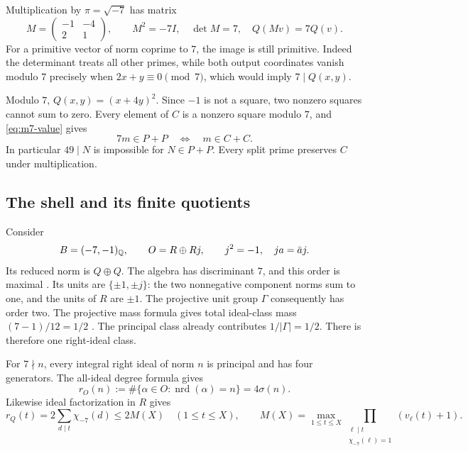 Multiplication by \(\pi=\sqrt{-7}\) has matrix
\[
 M=\begin{pmatrix}-1&-4\\2&1\end{pmatrix},\qquad
 M^2=-7I,\quad \det M=7,\quad Q(Mv)=7Q(v).
\]
For a primitive vector of norm coprime to \(7\), the image is still
primitive. Indeed the determinant treats all other primes, while
both output coordinates vanish modulo \(7\) precisely when
\(2x+y\equiv0\pmod7\), which would imply \(7\mid Q(x,y)\).

Modulo \(7\), \(Q(x,y)=(x+4y)^2\). Since \(-1\) is not a square,
two nonzero squares cannot sum to zero. Every element of \(C\) is
a nonzero square modulo \(7\), and \eqref{eq:m7-value} gives
\begin{equation}
      7m\in P+P\quad\Longleftrightarrow\quad m\in C+C.           \label{eq:m7-scale}
\end{equation}
In particular \(49\mid N\) is impossible for \(N\in P+P\).
Every split prime preserves \(C\) under multiplication.

\subsection{The shell and its finite quotients}

Consider
\[
 B=(-7,-1)_{\mathbb Q},\qquad
 O=R\oplus Rj,\qquad j^2=-1,\quad ja=\bar a j .
\]
Its reduced norm is \(Q\oplus Q\).
The algebra has discriminant \(7\), and this order is maximal
\cite[Theorem 15.5.5 and Example 15.5.7]{Voight}.
Its units are \(\{\pm1,\pm j\}\): the two nonnegative component
norms sum to one, and the units of \(R\) are \(\pm1\).
The projective unit group \(\Gamma\) consequently has order two.
The projective mass formula gives total ideal-class mass
\((7-1)/12=1/2\) \cite[Theorem 25.1.1]{Voight}.
The principal class already contributes \(1/|\Gamma|=1/2\).
There is therefore one right-ideal class.

For \(7\nmid n\), every integral right ideal of norm \(n\) is
principal and has four generators. The all-ideal degree formula
\cite[Propositions 41.3.1 and 41.3.6]{Voight} gives
\begin{equation}
 r_O(n):=\#\{\alpha\in O:\operatorname{nrd}(\alpha)=n\}
                              =4\sigma(n).                    \label{eq:m7-shell}
\end{equation}
Likewise ideal factorization in \(R\) gives
\begin{equation}
 r_Q(t)=2\sum_{d\mid t}\chi_{-7}(d)
       \le2M(X)\quad(1\le t\le X),\qquad
 M(X)=\max_{1\le t\le X}
       \prod_{\substack{\ell\mid t\\\chi_{-7}(\ell)=1}}
                       (v_\ell(t)+1).                         \label{eq:m7-divisor}
\end{equation}

